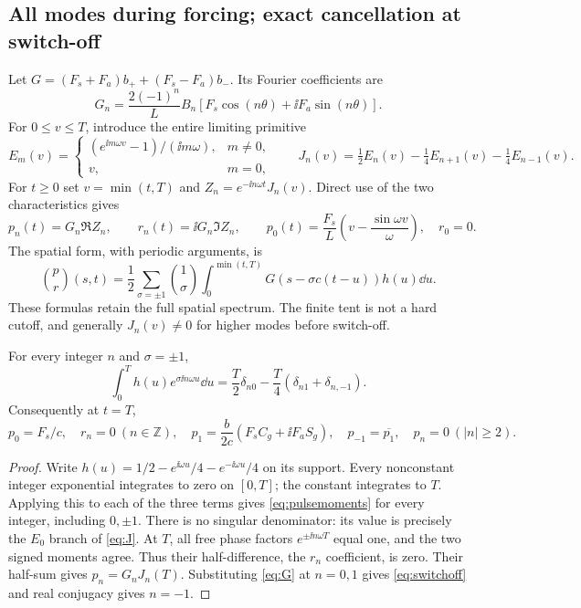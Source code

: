 \subsection{All modes during forcing; exact cancellation at switch-off}
Let $G=(F_s+F_a)b_++(F_s-F_a)b_-$. Its Fourier coefficients are
\begin{equation}\label{eq:G}
 G_n=\frac{2(-1)^n}{L}B_n[F_s\cos(n\theta)+\ii F_a\sin(n\theta)].
\end{equation}
For $0\le v\le T$, introduce the entire limiting primitive
\begin{equation}\label{eq:J}
 E_m(v)=\begin{cases}(e^{\ii m\omega v}-1)/(\ii m\omega),&m\ne0,\\v,&m=0,\end{cases}
 \qquad J_n(v)=\tfrac12E_n(v)-\tfrac14E_{n+1}(v)-\tfrac14E_{n-1}(v).
\end{equation}
For $t\ge0$ set $v=\min(t,T)$ and $Z_n=e^{-\ii n\omega t}J_n(v)$. Direct use of the two characteristics gives
\begin{equation}\label{eq:transient}
 p_n(t)=G_n\Re Z_n,\qquad r_n(t)=\ii G_n\Im Z_n,
 \qquad p_0(t)=\frac{F_s}{L}\left(v-\frac{\sin\omega v}{\omega}\right),\quad r_0=0.
\end{equation}
The spatial form, with periodic arguments, is
\begin{equation}\label{eq:directpulse}
 \binom p r(s,t)=\frac12\sum_{\sigma=\pm1}\binom1\sigma
 \int_0^{\min(t,T)}G(s-\sigma c(t-u))h(u)\dd u.
\end{equation}
These formulas retain the full spatial spectrum. The finite tent is not a hard cutoff, and generally $J_n(v)\ne0$ for higher modes before switch-off.

\begin{theorem}\label{thm:pulsemoments}
For every integer $n$ and $\sigma=\pm1$,
\begin{equation}\label{eq:pulsemoments}
 \int_0^T h(u)e^{\sigma\ii n\omega u}\dd u
 =\frac T2\delta_{n0}-\frac T4(\delta_{n1}+\delta_{n,-1}).
\end{equation}
Consequently at $t=T$,
\begin{equation}\label{eq:switchoff}
 p_0=F_s/c,\quad r_n=0\ (n\in\mathbb Z),\quad
 p_1=\frac b{2c}(F_sC_g+\ii F_aS_g),\quad p_{-1}=\overline{p_1},\quad p_n=0\ (|n|\ge2).
\end{equation}
\end{theorem}
\begin{proof}
Write $h(u)=1/2-e^{\ii\omega u}/4-e^{-\ii\omega u}/4$ on its support. Every nonconstant integer exponential integrates to zero on $[0,T]$; the constant integrates to $T$. Applying this to each of the three terms gives \eqref{eq:pulsemoments} for every integer, including $0,\pm1$. There is no singular denominator: its value is precisely the $E_0$ branch of \eqref{eq:J}. At $T$, all free phase factors $e^{\pm\ii n\omega T}$ equal one, and the two signed moments agree. Thus their half-difference, the $r_n$ coefficient, is zero. Their half-sum gives $p_n=G_nJ_n(T)$. Substituting \eqref{eq:G} at $n=0,1$ gives \eqref{eq:switchoff} and real conjugacy gives $n=-1$.
\end{proof}

